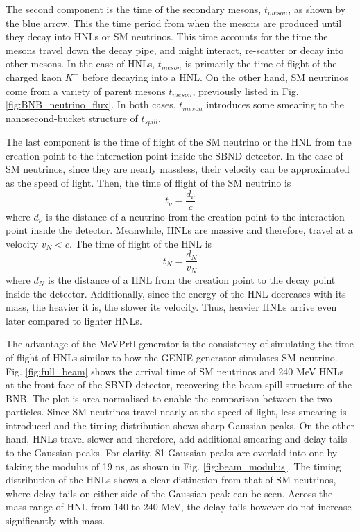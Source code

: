 The second component is the time of the secondary mesons, $t_{meson}$, as shown by the blue arrow.
This the time period from when the mesons are produced until they decay into HNLs or SM neutrinos.
This time accounts for the time the mesons travel down the decay pipe, and might interact, re-scatter or decay into other mesons.
In the case of HNLs, $t_{meson}$ is primarily the time of flight of the charged kaon $K^+$ before decaying into a HNL.
On the other hand, SM neutrinos come from a variety of parent mesons $t_{meson}$, previously listed in Fig. \ref{fig:BNB_neutrino_flux}.
In both cases, $t_{meson}$ introduces some smearing to the nanosecond-bucket structure of $t_{spill}$.

The last component is the time of flight of the SM neutrino or the HNL from the creation point to the interaction point inside the SBND detector.
In the case of SM neutrinos, since they are nearly massless, their velocity can be approximated as the speed of light. 
Then, the time of flight of the SM neutrino is  
\begin{equation}
	t_{\nu} = \frac{d_{\nu}}{c}
\end{equation}
where $d_{\nu}$ is the distance of a neutrino from the creation point to the interaction point inside the detector.
Meanwhile, HNLs are massive and therefore, travel at a velocity $v_N < c$.
The time of flight of the HNL is
\begin{equation}
	t_{N} = \frac{d_{N}}{v_N}
\end{equation}
where $d_N$ is the distance of a HNL from the creation point to the decay point inside the detector.
Additionally, since the energy of the HNL decreases with its mass, the heavier it is, the slower its velocity.
Thus, heavier HNLs arrive even later compared to lighter HNLs.

The advantage of the MeVPrtl generator is the consistency of simulating the time of flight of HNLs similar to how the GENIE generator simulates SM neutrino.
Fig. \ref{fig:full_beam} shows the arrival time of SM neutrinos and 240 MeV HNLs at the front face of the SBND detector, recovering the beam spill structure of the BNB.
The plot is area-normalised to enable the comparison between the two particles. 
Since SM neutrinos travel nearly at the speed of light, less smearing is introduced and the timing distribution shows sharp Gaussian peaks.
On the other hand, HNLs travel slower and therefore, add additional smearing and delay tails to the Gaussian peaks.
For clarity, 81 Gaussian peaks are overlaid into one by taking the modulus of 19 ns, as shown in Fig. \ref{fig:beam_modulus}.
The timing distribution of the HNLs shows a clear distinction from that of SM neutrinos, where delay tails on either side of the Gaussian peak can be seen.
Across the mass range of HNL from 140 to 240 MeV, the delay tails however do not increase significantly with mass.

